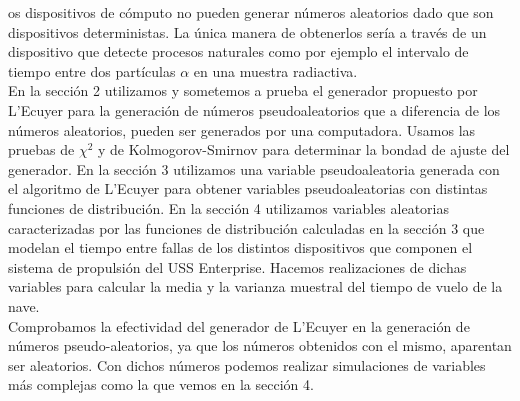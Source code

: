 \documentclass[10pt,journal,compsoc]{IEEEtran}
\begin{document}
os dispositivos de c\'omputo no pueden generar n\'umeros aleatorios dado que 
son dispositivos deterministas. La \'unica manera de obtenerlos ser\'ia a trav\'es de un dispositivo
que detecte procesos naturales como por ejemplo el intervalo de tiempo entre dos part\'iculas $\alpha$
en una muestra radiactiva.\\
\indent En la secci\'on 2 utilizamos y sometemos a prueba el generador propuesto por L'Ecuyer para la
generaci\'on de n\'umeros pseudoaleatorios que a diferencia de los n\'umeros aleatorios, pueden 
ser generados por una computadora. Usamos las pruebas de $\chi^2$ y de Kolmogorov-Smirnov para determinar la bondad de ajuste del
generador. En la secci\'on 3 utilizamos una variable pseudoaleatoria generada con el algoritmo de L'Ecuyer para
obtener variables pseudoaleatorias con distintas funciones de distribuci\'on. En la secci\'on 4 utilizamos variables
aleatorias caracterizadas por las funciones de distribuci\'on calculadas en la secci\'on 3 que modelan el tiempo
entre fallas de los distintos dispositivos que componen el sistema de propulsi\'on del USS Enterprise. Hacemos 
realizaciones de dichas variables para calcular la media y la varianza muestral del tiempo de vuelo de la nave.\\
Comprobamos la efectividad del generador de L'Ecuyer en la generaci\'on de n\'umeros pseudo-aleatorios,
ya que los n\'umeros obtenidos con el mismo, aparentan ser aleatorios. Con dichos n\'umeros podemos realizar
simulaciones de variables m\'as complejas como la que vemos en la secci\'on 4.  \\
\end{document}

